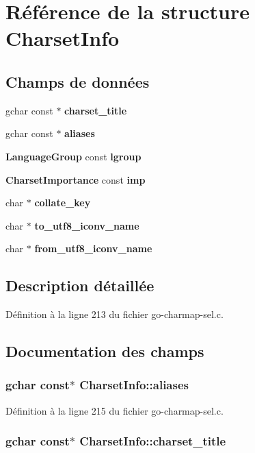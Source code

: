 \section{Référence de la structure CharsetInfo}
\label{structCharsetInfo}
\subsection*{Champs de données}
\begin{DoxyCompactItemize}
\item 
gchar const $\ast$ {\bf charset\_\-title}
\item 
gchar const $\ast$ {\bf aliases}
\item 
{\bf LanguageGroup} const {\bf lgroup}
\item 
{\bf CharsetImportance} const {\bf imp}
\item 
char $\ast$ {\bf collate\_\-key}
\item 
char $\ast$ {\bf to\_\-utf8\_\-iconv\_\-name}
\item 
char $\ast$ {\bf from\_\-utf8\_\-iconv\_\-name}
\end{DoxyCompactItemize}


\subsection{Description détaillée}


Définition à la ligne 213 du fichier go-\/charmap-\/sel.c.



\subsection{Documentation des champs}
\subsubsection[{aliases}]{\setlength{\rightskip}{0pt plus 5cm}gchar const$\ast$ {\bf CharsetInfo::aliases}}\label{structCharsetInfo_a7895f6da6e540877778378bcac0bfd3e}


Définition à la ligne 215 du fichier go-\/charmap-\/sel.c.

\subsubsection[{charset\_\-title}]{\setlength{\rightskip}{0pt plus 5cm}gchar const$\ast$ {\bf CharsetInfo::charset\_\-title}}\label{structCharsetInfo_ab76c922cedb7af43ea2d10e6abfa2a0c}



